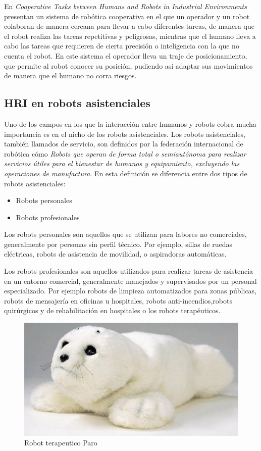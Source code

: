  En \textit{Cooperative Tasks between Humans and Robots in Industrial Environments}\cite{corrales2012cooperative} presentan un sistema de robótica cooperativa en el que un operador y un robot colaboran de manera cercana para llevar a cabo diferentes tareas, de manera que el robot realiza las tareas repetitivas y peligrosas, mientras que el humano lleva a cabo las tareas que requieren de cierta precisión o inteligencia con la que no cuenta el robot. En este sistema el operador lleva un traje de posicionamiento, que permite al robot conocer su posición, pudiendo así adaptar sus movimientos de manera que el humano no corra riesgos.
 
 
 
 \subsection{HRI en robots asistenciales}
 Uno de los campos en los que la interacción entre humanos y robots cobra mucha importancia es en el nicho de los robots asistenciales. Los robots asistenciales, también llamados de servicio, son definidos por la federación internacional de robótica cómo \textit{Robots que operan de forma total o semiautónoma para realizar servicios útiles para el bienestar de humanos y equipamiento, excluyendo las operaciones de manufactura}\cite{ifr-service-robots}. En esta definición se diferencia entre dos tipos de robots asistenciales:
 \begin{itemize}
 	\item Robots personales
 	\item Robots profesionales
 \end{itemize}
 
 Los robots personales son aquellos que se utilizan para labores no comerciales, generalmente por personas sin perfil técnico. Por ejemplo, sillas de ruedas eléctricas, robots de asistencia de movilidad, o aspiradoras automáticas.
 
 Los robots profesionales son aquellos utilizados para realizar tareas de asistencia en un entorno comercial, generalmente manejados y supervisados por un personal especializado. Por ejemplo robots de limpieza automatizados para zonas públicas, robots de mensajería en oficinas u hospitales, robots anti-incendios,robots quirúrgicos y de rehabilitación en hospitales o los robots terapéuticos.
 \begin{figure}
	\centering
	\includegraphics[width=0.8\linewidth]{imagenes/parorobot.JPG}
	\caption{Robot terapeutico Paro}
	\label{fig:parorobot}
\end{figure} 

